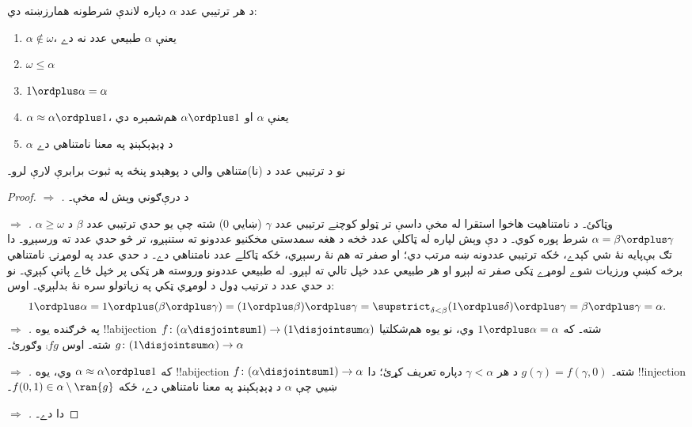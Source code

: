 \documentclass[../../../include/open-logic-section]{subfiles}
\begin{document}
\begin{lem}
د هر ترتيبي عدد $\alpha$ دپاره لاندې شرطونه همارزښته دي:
\begin{enumerate}
	\item{} $\alpha\notin \omega$، يعنې
	$\alpha$ طبيعي عدد نه دے
	\item{} $\omega \leq \alpha$
	\item{} $1 \ordplus  \alpha = \alpha$
	\item{} $\alpha \approx \alpha\ordplus 1$،
	يعنې $\alpha$ او $\alpha\ordplus 1$ هم‌شمېره دي
	\item{} $\alpha$ د ډېډېکېنډ په معنا نامتناهي دے
	\end{enumerate}
\end{lem}
\noindent
نو د ترتيبي عدد د (نا)متناهي والي د پوهېدو پنځه په ثبوت برابرې
لارې لرو۔

\begin{proof}
\emph{ $\Rightarrow$ .}
د درې‌ګوني وېش له مخې۔

\emph{ $\Rightarrow$ .}
$\alpha \geq \omega$ وټاکئ۔ د نامتناهيت هاخوا استقرا له مخې داسې
تر ټولو کوچنے ترتيبي عدد $\gamma$ (ښايي $0$) شته چې يو حدي
ترتيبي عدد $\beta$ د $\alpha = \beta \ordplus \gamma$ شرط پوره
کوي۔ د دې وېش لپاره له ټاکلي عدد څخه د هغه سمدستي مخکنيو
عددونو ته ستنېږو، تر څو حدي عدد ته ورسېږو۔ دا تګ بې‌پايه
نۀ شي کېدے، ځکه ترتيبي عددونه ښه مرتب دي؛ او صفر ته هم
نۀ رسېږي، ځکه ټاکلے عدد نامتناهي دے۔ د حدي عدد په لومړنۍ
نامتناهي برخه کښې ورزيات شوے لومړے ټکی صفر ته لېږو او هر
طبيعي عدد خپل تالي ته لېږو۔ له طبيعي عددونو وروسته هر ټکی
پر خپل ځاے پاتې کېږي۔ نو د حدي عدد د ترتيب ډول د لومړي
ټکي په زياتولو سره نۀ بدلېږي۔ اوس:
\[
	1 \ordplus \alpha =
	1 \ordplus (\beta \ordplus \gamma) =
	(1 \ordplus \beta) \ordplus \gamma =
	\supstrict_{\delta < \beta} (1 \ordplus  \delta) \ordplus  \gamma =
	\beta \ordplus  \gamma =
	\alpha.
\]
\emph{ $\Rightarrow$ .}
په څرګنده يوه !!a{bijection}
$f \colon (\alpha \disjointsum 1) \to (1 \disjointsum \alpha)$
شته۔ که $1 \ordplus \alpha = \alpha$ وي، نو يوه هم‌شکلتيا
$g \colon (1 \disjointsum \alpha) \to \alpha$ شته۔ اوس
$\comp{f}{g}$ وګورئ۔

\emph{ $\Rightarrow$ .}
که $\alpha \approx \alpha \ordplus 1$ وي، يوه !!a{bijection}
$f \colon (\alpha \disjointsum 1) \to \alpha$ شته۔
$g(\gamma) = f(\gamma, 0)$ د هر $\gamma < \alpha$ دپاره تعريف کړئ؛
دا !!{injection} ښيي چې $\alpha$ د ډېډېکېنډ په معنا نامتناهي دے،
ځکه $f(0,1) \in \alpha \setminus \ran{g}$۔

\emph{ $\Rightarrow$ .}
دا  دے۔
\end{proof}
\end{document}
